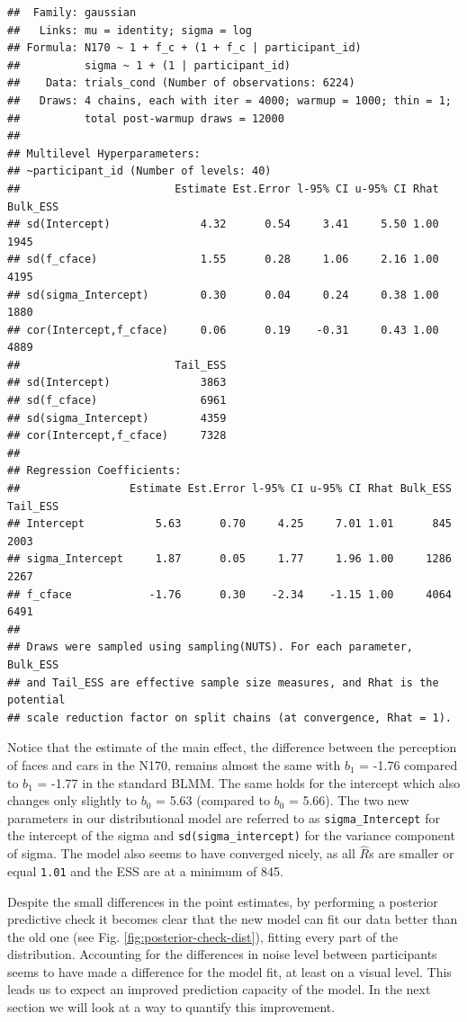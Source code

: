 \documentclass[
  doc,12pt,floatsintext]{apa7}
\begin{document}
\begin{verbatim}
##  Family: gaussian 
##   Links: mu = identity; sigma = log 
## Formula: N170 ~ 1 + f_c + (1 + f_c | participant_id) 
##          sigma ~ 1 + (1 | participant_id)
##    Data: trials_cond (Number of observations: 6224) 
##   Draws: 4 chains, each with iter = 4000; warmup = 1000; thin = 1;
##          total post-warmup draws = 12000
## 
## Multilevel Hyperparameters:
## ~participant_id (Number of levels: 40) 
##                        Estimate Est.Error l-95% CI u-95% CI Rhat Bulk_ESS
## sd(Intercept)              4.32      0.54     3.41     5.50 1.00     1945
## sd(f_cface)                1.55      0.28     1.06     2.16 1.00     4195
## sd(sigma_Intercept)        0.30      0.04     0.24     0.38 1.00     1880
## cor(Intercept,f_cface)     0.06      0.19    -0.31     0.43 1.00     4889
##                        Tail_ESS
## sd(Intercept)              3863
## sd(f_cface)                6961
## sd(sigma_Intercept)        4359
## cor(Intercept,f_cface)     7328
## 
## Regression Coefficients:
##                 Estimate Est.Error l-95% CI u-95% CI Rhat Bulk_ESS Tail_ESS
## Intercept           5.63      0.70     4.25     7.01 1.01      845     2003
## sigma_Intercept     1.87      0.05     1.77     1.96 1.00     1286     2267
## f_cface            -1.76      0.30    -2.34    -1.15 1.00     4064     6491
## 
## Draws were sampled using sampling(NUTS). For each parameter, Bulk_ESS
## and Tail_ESS are effective sample size measures, and Rhat is the potential
## scale reduction factor on split chains (at convergence, Rhat = 1).
\end{verbatim}

\normalsize

Notice that the estimate of the main effect, the difference between the perception of faces and cars in the N170, remains almost the same with \(b_1\) = -1.76 compared to \(b_1\) = -1.77 in the standard BLMM. The same holds for the intercept which also changes only slightly to \(b_0\) = 5.63 (compared to \(b_0\) = 5.66). The two new parameters in our distributional model are referred to as \texttt{sigma\_Intercept} for the intercept of the sigma and \texttt{sd(sigma\_intercept)} for the variance component of sigma. The model also seems to have converged nicely, as all \(\hat{R}\)s are smaller or equal \texttt{1.01} and the ESS are at a minimum of 845.

Despite the small differences in the point estimates, by performing a posterior predictive check it becomes clear that the new model can fit our data better than the old one (see Fig. \ref{fig:posterior-check-dist}), fitting every part of the distribution. Accounting for the differences in noise level between participants seems to have made a difference for the model fit, at least on a visual level. This leads us to expect an improved prediction capacity of the model. In the next section we will look at a way to quantify this improvement.
\end{document}
